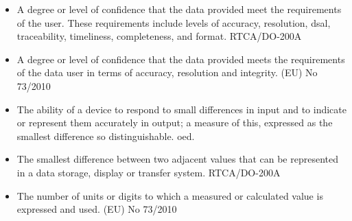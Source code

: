 	


%
	{\begin{itemize}
			\item A degree or level of confidence that the data provided meet the requirements of the user. These requirements include levels of \gls{accuracy}, \gls{resolution}, \cbstart\gls{dsal}\cbend{}, \gls{traceability}, timeliness, \gls{completeness}, and format. RTCA/DO-200A \cite{citation:ED76}
			\item A degree or level of confidence that the data provided meets the requirements of the data user in terms of \gls{accuracy}, \gls{resolution} and \gls{integrity}. (EU) No 73/2010 \cite{citation:EU732010}
	\end{itemize}}

%
	{\begin{itemize}
			\item The ability of a device to respond to small differences in input and to indicate or represent them accurately in output; a measure of this, expressed as the smallest difference so distinguishable. \gls{oed}.
			\item The smallest difference between two adjacent values that can be represented in a data storage, display or transfer system. RTCA/DO-200A \cite{citation:ED76}
			\item The number of units or digits to which a measured or calculated value is expressed and used. (EU) No 73/2010 \cite{citation:EU732010}
	\end{itemize}}

